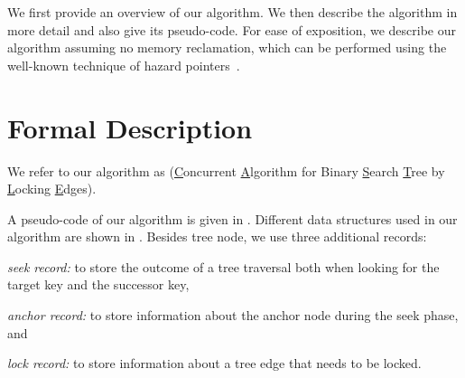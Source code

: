 \begin{limitscope}
\newcommand{\accesspath}{access-path}
\newcommand{\terminalnode}{terminal node}

\newcommand{\sNodeOne}{\mathbb{R}}
\newcommand{\sNodeTwo}{\mathbb{S}}
\newcommand{\sKeyOne}{\infty_1}
\newcommand{\sKeyTwo}{\infty_2}

\newcommand{\targetnode}{target node}
\newcommand{\anchornode}{anchor node}

\newcommand{\myparent}{parent}
\newcommand{\myleft}{le\!f\!t}
\newcommand{\myright}{right}

\newcommand{\RemoveChild}{\textsc{RemoveChild}}
\newcommand{\LockAll}{\textsc{LockAll}}
\newcommand{\UnlockAll}{\textsc{UnlockAll}}
\newcommand{\ClearFlags}{\textsc{ClearFlags}}
\newcommand{\FindSmallest}{\textsc{FindSmallest}}

\newcommand{\lFlag}{lFlag}
\newcommand{\mFlag}{mFlag}
\newcommand{\nFlag}{nFlag}


We first provide an overview of our algorithm. We then describe the algorithm in more detail and also give its pseudo-code. For ease of exposition, we describe our algorithm assuming no memory reclamation, which can be performed using the well-known technique of hazard pointers~\cite{Mic:2004:TPDS}.





\section{Formal Description}

We refer to our algorithm as \CASTLE{} (\underline{C}oncurrent \underline{A}lgorithm for Binary \underline{S}earch \underline{T}ree by \underline{L}ocking \underline{E}dges). 



A pseudo-code of our algorithm is given in .
Different data structures used in our algorithm are shown in . Besides tree node, we use three additional records:
\begin{enumerate*}[label=(\alph*)]
\item  \emph{seek record:} to store the outcome of a tree traversal both when looking for the target key and the successor key, 
\item \emph{anchor record:} to store information about the \anchornode{} during the seek phase, and
\item  \emph{lock record:} to store information about a tree edge that needs to be locked. 
\end{enumerate*}


\end{limitscope}
